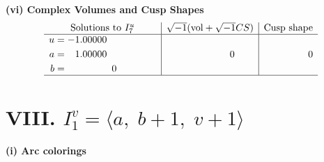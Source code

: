 \documentclass[1p]{elsarticle_modified}
\theoremstyle{definition}
\newcommand{\I}{\sqrt{-1}}
\begin{document}
\newpage\flushleft \textbf{(vi) Complex Volumes and Cusp Shapes}
$$\begin{array}{c|c|c}  
\text{Solutions to }I^u_{7}& \I (\text{vol} + \sqrt{-1}CS) & \text{Cusp shape}\\
 \hline 
\begin{aligned}
u &= -1.00000\phantom{ +0.000000I} \\
a &= \phantom{-}1.00000\phantom{ +0.000000I} \\
b &= \phantom{-0.000000 } 0\end{aligned}
 & \phantom{-0.000000 } 0 & \phantom{-0.000000 } 0\\
 \hline 
 \end{array}$$\newpage\newpage\renewcommand{\arraystretch}{1}
\centering \section*{VIII. $I^v_{1}= \langle a,\;b+1,\;v+1 \rangle$}
\flushleft \textbf{(i) Arc colorings}\\
\end{document}
